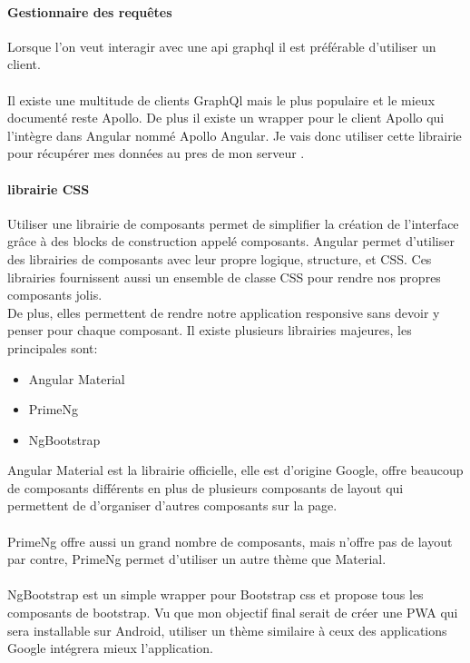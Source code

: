 \paragraph{Gestionnaire des requêtes}
Lorsque l'on veut interagir avec une \Gls{api} graphql il est préférable d'utiliser un client.\\\\

Il existe une multitude de clients GraphQl mais le plus populaire et le mieux documenté reste Apollo.
De plus il existe un wrapper pour le client Apollo qui l'intègre dans Angular nommé Apollo Angular.
Je vais donc utiliser cette librairie pour récupérer mes données au pres de mon serveur .

\paragraph{librairie CSS}
Utiliser une librairie de composants permet de simplifier la création de l'interface grâce à des blocks de construction appelé composants\@.
Angular permet d'utiliser des librairies de composants avec leur propre logique, structure, et CSS\@.
Ces librairies fournissent aussi un ensemble de classe CSS pour rendre nos propres composants jolis.\\
De plus, elles permettent de rendre notre application responsive sans devoir y penser pour chaque composant.
Il existe plusieurs librairies majeures, les principales sont:
\begin{itemize}
    \item Angular Material
    \item PrimeNg
    \item NgBootstrap
\end{itemize}
Angular Material est la librairie officielle, elle est d'origine Google,
offre beaucoup de composants différents en plus de plusieurs composants de layout qui permettent de d'organiser d'autres composants sur la page.\\\\

PrimeNg offre aussi un grand nombre de composants, mais n'offre pas de layout par contre,
PrimeNg permet d'utiliser un autre thème que Material.\\\\
NgBootstrap est un simple wrapper pour Bootstrap css et propose tous les composants de bootstrap.
Vu que mon objectif final serait de créer une PWA qui sera installable sur Android,
utiliser un thème similaire à ceux des applications Google intégrera mieux l'application.

